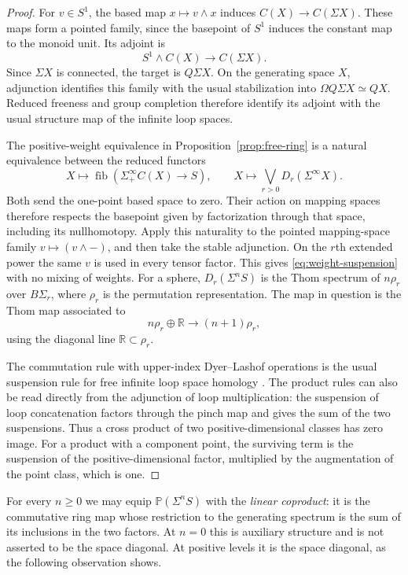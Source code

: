 \begin{proof}
For $v\in S^1$, the based map $x\mapsto v\wedge x$ induces
$C(X)\to C(\Sigma X)$. These maps form a pointed family, since the
basepoint of $S^1$ induces the constant map to the monoid unit. Its
adjoint is
\[
 S^1\wedge C(X)\longrightarrow C(\Sigma X).
\]
Since $\Sigma X$ is connected, the target is $Q\Sigma X$. On the
generating space $X$, adjunction identifies this family with the usual
stabilization into $\Omega Q\Sigma X\simeq QX$. Reduced freeness and
group completion therefore identify its adjoint with the usual structure
map of the infinite loop spaces.

The positive-weight equivalence in Proposition~\ref{prop:free-ring} is
a natural equivalence between the reduced functors
\[
 X\longmapsto\operatorname{fib}(\Sigma^\infty_+C(X)\to S),
 \qquad
 X\longmapsto\bigvee_{r>0}D_r(\Sigma^\infty X).
\]
Both send the one-point based space to zero. Their action on mapping
spaces therefore respects the basepoint given by factorization through
that space, including its nullhomotopy. Apply this naturality to the
pointed mapping-space family
$v\mapsto(v\wedge-)$, and then take the stable adjunction. On the
$r$th extended power the same $v$ is used in every tensor factor. This
gives \eqref{eq:weight-suspension} with no mixing of weights. For a
sphere, $D_r(\Sigma^nS)$ is the Thom spectrum of $n\rho_r$ over
$B\Sigma_r$, where $\rho_r$ is the permutation representation. The
map in question is the Thom map associated to
\[
 n\rho_r\oplus\mathbb R\longrightarrow(n+1)\rho_r,
\]
using the diagonal line $\mathbb R\subset\rho_r$.

The commutation rule with upper-index Dyer--Lashof operations is the
usual suspension rule for free infinite loop space homology
\cite[\S20, p.~481]{May1977}. The product rules can also be read directly from the
adjunction of loop multiplication: the suspension of loop concatenation
factors through the pinch map and gives the sum of the two suspensions.
Thus a cross product of two positive-dimensional classes has zero image.
For a product with a component point, the surviving term is the
suspension of the positive-dimensional factor, multiplied by the
augmentation of the point class, which is one.
\end{proof}

For every $n\geq0$ we may equip $\mathbb P(\Sigma^nS)$ with the
\emph{linear coproduct}: it is the commutative ring map whose restriction
to the generating spectrum is the sum of its inclusions in the two
factors. At $n=0$ this is auxiliary structure and is not asserted to be
the space diagonal. At positive levels it is the space diagonal, as the
following observation shows.

